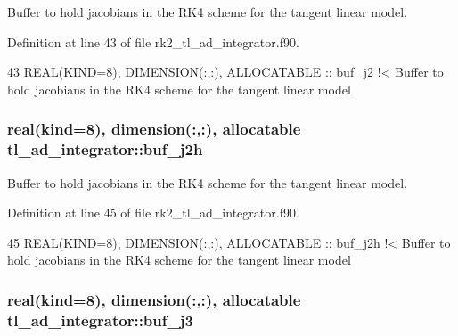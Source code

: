Buffer to hold jacobians in the R\+K4 scheme for the tangent linear model. 



Definition at line 43 of file rk2\+\_\+tl\+\_\+ad\+\_\+integrator.\+f90.


\begin{DoxyCode}
43   \textcolor{keywordtype}{REAL(KIND=8)}, \textcolor{keywordtype}{DIMENSION(:,:)}, \textcolor{keywordtype}{ALLOCATABLE} :: buf\_j2\textcolor{comment}{ !< Buffer to hold jacobians in the RK4 scheme for the
       tangent linear model}
\end{DoxyCode}
\subsubsection[{\texorpdfstring{buf\+\_\+j2h}{buf_j2h}}]{\setlength{\rightskip}{0pt plus 5cm}real(kind=8), dimension(\+:,\+:), allocatable tl\+\_\+ad\+\_\+integrator\+::buf\+\_\+j2h\hspace{0.3cm}{\ttfamily [private]}}\hypertarget{namespacetl__ad__integrator_a2a5e4cbc6f573f1274e53cbb4607f5bb}{}\label{namespacetl__ad__integrator_a2a5e4cbc6f573f1274e53cbb4607f5bb}


Buffer to hold jacobians in the R\+K4 scheme for the tangent linear model. 



Definition at line 45 of file rk2\+\_\+tl\+\_\+ad\+\_\+integrator.\+f90.


\begin{DoxyCode}
45   \textcolor{keywordtype}{REAL(KIND=8)}, \textcolor{keywordtype}{DIMENSION(:,:)}, \textcolor{keywordtype}{ALLOCATABLE} :: buf\_j2h\textcolor{comment}{ !< Buffer to hold jacobians in the RK4 scheme for
       the tangent linear model}
\end{DoxyCode}
\subsubsection[{\texorpdfstring{buf\+\_\+j3}{buf_j3}}]{\setlength{\rightskip}{0pt plus 5cm}real(kind=8), dimension(\+:,\+:), allocatable tl\+\_\+ad\+\_\+integrator\+::buf\+\_\+j3\hspace{0.3cm}{\ttfamily [private]}}\hypertarget{namespacetl__ad__integrator_afb500987b643ce33b2a549ba213221fc}{}\label{namespacetl__ad__integrator_afb500987b643ce33b2a549ba213221fc}



